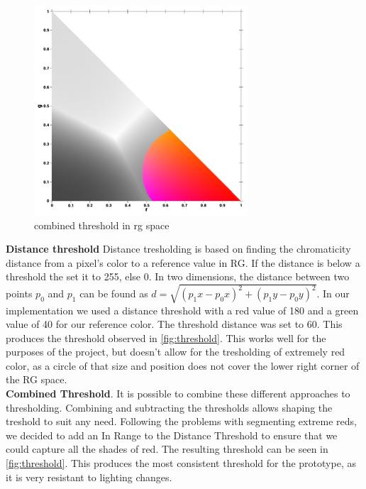 {\begin{multicols}{2}
	\begin{figure}[H]
		\centering
		\includegraphics[width=1\linewidth]{figure/Analysis/thresholdcolor.png}
		\caption{combined threshold in rg space}
		\label{fig:threshold}
	\end{figure}	
\end{multicols}
\textbf{Distance threshold} Distance tresholding is based on finding the chromaticity distance from a pixel's color to a reference value in RG. If the distance is below a threshold the set it to 255, else 0. In two dimensions, the distance between two points $p_0$ and $p_1$ can be found as $d = \sqrt{(p_1x - p_0x)^2 +(p_1y - p_0y)^2}$. In our implementation we used a distance threshold with a red value of 180 and a green value of 40 for our reference color. The threshold distance was set to 60. This produces the threshold observed in \autoref{fig:threshold}. This works well for the purposes of the project, but doesn't allow for the tresholding of extremely red color, as a circle of that size and position does not cover the lower right corner of the RG space. \\

\textbf{Combined Threshold}. It is possible to combine these different approaches to thresholding. Combining and subtracting the thresholds allows shaping the treshold to suit any need. Following the problems with segmenting extreme reds, we decided to add an In Range to the Distance Threshold to ensure that we could capture all the shades of red. The resulting threshold can be seen in \autoref{fig:threshold}. This produces the most consistent threshold for the prototype, as it is very resistant to lighting changes.

}
